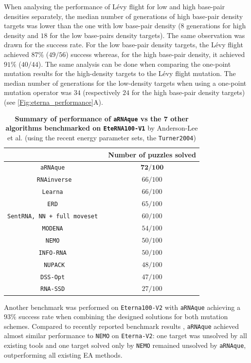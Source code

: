 When analysing the performance of Lévy flight for low and high base-pair densities separately, the median number of generations of high base-pair density targets was lower than the one with low base-pair density ($8$ generations for high density and $18$ for the low base-pairs density targets). The same observation was drawn for the success rate. For the low base-pair density targets, the Lévy flight achieved $87\%$ ($49/56$) success whereas, for the high base-pair density, it achieved $91\%$ ($40/44$). The same analysis can be done when comparing the one-point mutation results for the high-density targets to the Lévy flight mutation. The median number of generations for the low-density targets when using a one-point mutation operator was $34$ (respectively $24$ for the high base-pair density targets) (see \autoref{Fig:eterna_performance}A). 

\begin{center}
	\begin{table}[t!]
		\caption{\textbf{Summary of performance of \texttt{aRNAque} vs the 7 other algorithms benchmarked on \texttt{EteRNA100-V1}} by Anderson-Lee et al. \cite{anderson2016principles} (using the recent energy parameter sets, the \texttt{Turner2004})} 
		\label{Tab:eterna}
		\centering
		\begin{tabular}[H]{|c|c|}
			\hline
			\text{Methods}& Number of puzzles solved\\
			\hline
			\texttt{aRNAque }&$\textbf{72/100}$\\
			\hline
			\texttt{RNAinverse}&$66/100$\\
			\hline
			\texttt{Learna }&$66/100$\\
			\hline
			\texttt{ERD }&$65/100$\\
			\hline
			\texttt{SentRNA, NN + full moveset  }&$60/100$\\
			\hline
			\texttt{MODENA }&$54/100$\\
			\hline
			\texttt{NEMO }&$50/100$\\
			\hline
			\texttt{INFO-RNA }&$50/100$\\
			\hline
			\texttt{NUPACK}&$48/100$\\
			\hline
			\texttt{DSS-Opt }&$47/100$\\
			\hline
			\texttt{RNA-SSD }&$27/100$\\
			\hline
		\end{tabular}
	\end{table}
\end{center}
Another benchmark was performed on \texttt{Eterna100-V2} with \texttt{aRNAque} achieving a $93\%$ success rate when combining the designed solutions for both mutation schemes. Compared to recently reported benchmark results \cite{Eterna}, \texttt{aRNAque} achieved almost similar performance to \texttt{NEMO} on \texttt{Eterna-V2}: one target was unsolved by all existing tools and one target solved only by \texttt{NEMO} remained unsolved by \texttt{aRNAque}, outperforming all existing \ac{EA} methods. 


